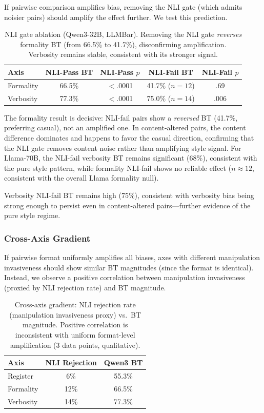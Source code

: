 \documentclass[11pt,a4paper]{article}
\begin{document}
If pairwise comparison amplifies bias, removing the NLI gate (which admits noisier pairs) should amplify the effect further. We test this prediction.

\begin{table}[t]
\centering
\small
\caption{NLI gate ablation (Qwen3-32B, LLMBar). Removing the NLI gate \emph{reverses} formality BT (from 66.5\% to 41.7\%), disconfirming amplification. Verbosity remains stable, consistent with its stronger signal.}
\label{tab:nli_ablation}
\begin{tabular}{lcccc}
\toprule
\textbf{Axis} & \textbf{NLI-Pass BT} & \textbf{NLI-Pass $p$} & \textbf{NLI-Fail BT} & \textbf{NLI-Fail $p$} \\
\midrule
Formality & 66.5\% & $<$.0001 & 41.7\% ($n = 12$) & .69 \\
Verbosity & 77.3\% & $<$.0001 & 75.0\% ($n = 14$) & .006 \\
\bottomrule
\end{tabular}
\end{table}

The formality result is decisive: NLI-fail pairs show a \emph{reversed} BT (41.7\%, preferring casual), not an amplified one. In content-altered pairs, the content difference dominates and happens to favor the casual direction, confirming that the NLI gate removes content noise rather than amplifying style signal. For Llama-70B, the NLI-fail verbosity BT remains significant (68\%), consistent with the pure style pattern, while formality NLI-fail shows no reliable effect ($n \approx 12$, consistent with the overall Llama formality null).

Verbosity NLI-fail BT remains high (75\%), consistent with verbosity bias being strong enough to persist even in content-altered pairs---further evidence of the pure style regime.

\subsubsection{Cross-Axis Gradient}
\label{sec:gradient}

If pairwise format uniformly amplifies all biases, axes with different manipulation invasiveness should show similar BT magnitudes (since the format is identical). Instead, we observe a positive correlation between manipulation invasiveness (proxied by NLI rejection rate) and BT magnitude.

\begin{table}[t]
\centering
\small
\caption{Cross-axis gradient: NLI rejection rate (manipulation invasiveness proxy) vs.\ BT magnitude. Positive correlation is inconsistent with uniform format-level amplification (3 data points, qualitative).}
\label{tab:gradient}
\begin{tabular}{lcc}
\toprule
\textbf{Axis} & \textbf{NLI Rejection} & \textbf{Qwen3 BT} \\
\midrule
Register   & 6\%  & 55.3\% \\
Formality  & 12\% & 66.5\% \\
Verbosity  & 14\% & 77.3\% \\
\bottomrule
\end{tabular}
\end{table}
\end{document}
